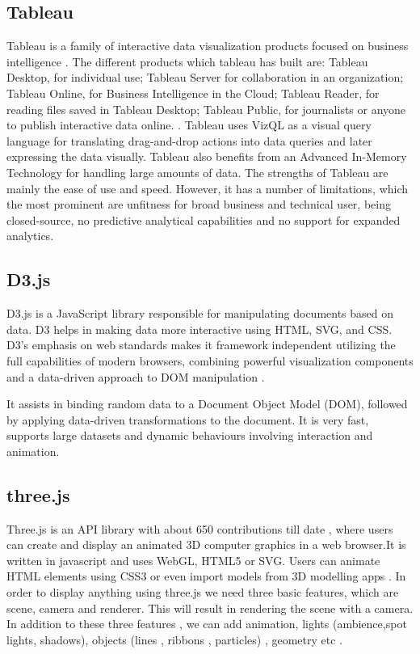 \subsection{Tableau}

    Tableau is a family of interactive data visualization products
    focused on business intelligence \cite{www-tableau-tutorial} . The
    different products which tableau has built are: Tableau Desktop,
    for individual use; Tableau Server for collaboration in an
    organization; Tableau Online, for Business Intelligence in the
    Cloud; Tableau Reader, for reading files saved in Tableau Desktop;
    Tableau Public, for journalists or anyone to publish interactive
    data online. \cite{www-tableau-web}. Tableau uses VizQL as a
    visual query language for translating drag-and-drop actions into
    data queries and later expressing the data visually. Tableau also
    benefits from an Advanced In-Memory Technology for handling large
    amounts of data.  The strengths of Tableau are mainly the ease of
    use and speed.  However, it has a number of limitations, which the
    most prominent are unfitness for broad business and technical
    user, being closed-source, no predictive analytical capabilities
    and no support for expanded analytics.

\pv

\subsection{D3.js}

    D3.js is a JavaScript library responsible for manipulating
    documents based on data. D3 helps in making data more interactive
    using HTML, SVG, and CSS. D3’s emphasis on web standards makes it
    framework independent utilizing the full capabilities of modern
    browsers, combining powerful visualization components and a
    data-driven approach to DOM manipulation \cite{www-d3}.

    It assists in binding random data to a Document Object Model
    (DOM), followed by applying data-driven transformations to the
    document. It is very fast, supports large datasets and dynamic
    behaviours involving interaction and animation.

    
\subsection{three.js}

    Three.js is an API library with about 650 contributions till date
    , where users can create and display an animated 3D computer
    graphics in a web browser.It is written in javascript and uses
    WebGL, HTML5 or SVG. Users can animate HTML elements using CSS3 or
    even import models from 3D modelling apps
    \cite{www-threejs-wiki}. In order to display anything using
    three.js we need three basic features, which are scene, camera and
    renderer. This will result in rendering the scene with a
    camera. In addition to these three features , we can add
    animation, lights (ambience,spot lights, shadows), objects (lines
    , ribbons , particles) , geometry etc \cite{www-threejs-webpage}.
    

